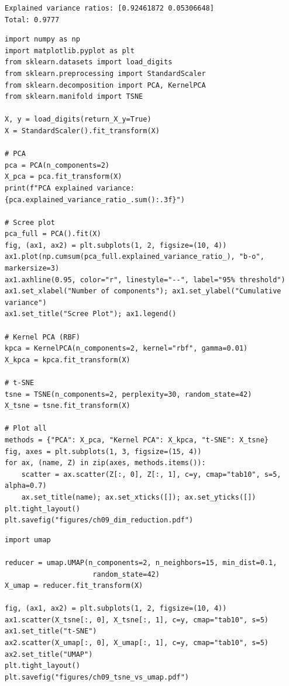 \begin{codeoutput}
\begin{verbatim}
Explained variance ratios: [0.92461872 0.05306648]
Total: 0.9777
\end{verbatim}
\end{codeoutput}

\begin{codeblock}[title=\textbf{PCA, Kernel PCA, $t$-SNE, and UMAP with scikit-learn}]
\begin{verbatim}
import numpy as np
import matplotlib.pyplot as plt
from sklearn.datasets import load_digits
from sklearn.preprocessing import StandardScaler
from sklearn.decomposition import PCA, KernelPCA
from sklearn.manifold import TSNE

X, y = load_digits(return_X_y=True)
X = StandardScaler().fit_transform(X)

# PCA
pca = PCA(n_components=2)
X_pca = pca.fit_transform(X)
print(f"PCA explained variance: {pca.explained_variance_ratio_.sum():.3f}")

# Scree plot
pca_full = PCA().fit(X)
fig, (ax1, ax2) = plt.subplots(1, 2, figsize=(10, 4))
ax1.plot(np.cumsum(pca_full.explained_variance_ratio_), "b-o", markersize=3)
ax1.axhline(0.95, color="r", linestyle="--", label="95% threshold")
ax1.set_xlabel("Number of components"); ax1.set_ylabel("Cumulative variance")
ax1.set_title("Scree Plot"); ax1.legend()

# Kernel PCA (RBF)
kpca = KernelPCA(n_components=2, kernel="rbf", gamma=0.01)
X_kpca = kpca.fit_transform(X)

# t-SNE
tsne = TSNE(n_components=2, perplexity=30, random_state=42)
X_tsne = tsne.fit_transform(X)

# Plot all
methods = {"PCA": X_pca, "Kernel PCA": X_kpca, "t-SNE": X_tsne}
fig, axes = plt.subplots(1, 3, figsize=(15, 4))
for ax, (name, Z) in zip(axes, methods.items()):
    scatter = ax.scatter(Z[:, 0], Z[:, 1], c=y, cmap="tab10", s=5, alpha=0.7)
    ax.set_title(name); ax.set_xticks([]); ax.set_yticks([])
plt.tight_layout()
plt.savefig("figures/ch09_dim_reduction.pdf")
\end{verbatim}
\end{codeblock}

\begin{codeblock}[title=\textbf{UMAP (requires \texttt{umap-learn} package)}]
\begin{verbatim}
import umap

reducer = umap.UMAP(n_components=2, n_neighbors=15, min_dist=0.1,
                     random_state=42)
X_umap = reducer.fit_transform(X)

fig, (ax1, ax2) = plt.subplots(1, 2, figsize=(10, 4))
ax1.scatter(X_tsne[:, 0], X_tsne[:, 1], c=y, cmap="tab10", s=5)
ax1.set_title("t-SNE")
ax2.scatter(X_umap[:, 0], X_umap[:, 1], c=y, cmap="tab10", s=5)
ax2.set_title("UMAP")
plt.tight_layout()
plt.savefig("figures/ch09_tsne_vs_umap.pdf")
\end{verbatim}
\end{codeblock}


